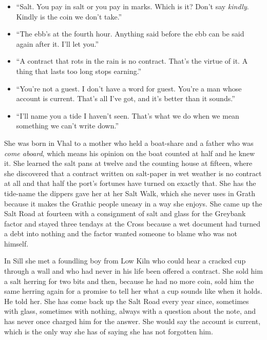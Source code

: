 \documentclass{design/chronicle}
\begin{document}
{\begin{itemize}[leftmargin=1.4em,itemsep=1pt,topsep=3pt,parsep=0pt]
\item “Salt. You pay in salt or you pay in marks. Which is it? Don’t say \emph{kindly}. Kindly is the coin we don’t take.”

\item “The ebb’s at the fourth hour. Anything said before the ebb can be said again after it. I’ll let you.”

\item “A contract that rots in the rain is no contract. That’s the virtue of it. A thing that lasts too long stops earning.”

\item “You’re not a guest. I don’t have a word for guest. You’re a man whose account is current. That’s all I’ve got, and it’s better than it sounds.”

\item “I’ll name you a tide I haven’t seen. That’s what we do when we mean something we can’t write down.”

\end{itemize}

She was born in Vhal to a mother who held a boat-share and a father who was \emph{come aboard}, which means his opinion on the boat counted at half and he knew it. She learned the salt pans at twelve and the counting house at fifteen, where she discovered that a contract written on salt-paper in wet weather is no contract at all and that half the port’s fortunes have turned on exactly that. She has the tide-name the dippers gave her at her Salt Walk, which she never uses in Grath because it makes the Grathic people uneasy in a way she enjoys. She came up the Salt Road at fourteen with a consignment of salt and glass for the Greybank factor and stayed three tendays at the Cross because a wet document had turned a debt into nothing and the factor wanted someone to blame who was not himself.

In Sill she met a foundling boy from Low Kiln who could hear a cracked cup through a wall and who had never in his life been offered a contract. She sold him a salt herring for two bits and then, because he had no more coin, sold him the same herring again for a promise to tell her what a cup sounds like when it holds. He told her. She has come back up the Salt Road every year since, sometimes with glass, sometimes with nothing, always with a question about the note, and has never once charged him for the answer. She would say the account is current, which is the only way she has of saying she has not forgotten him.

}
\end{document}
